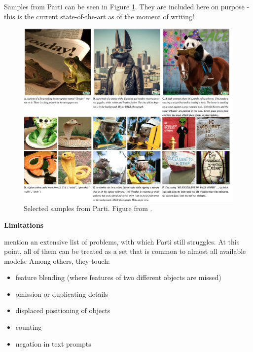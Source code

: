 \documentclass[
]{krantz}
\providecommand{\tightlist}{%
  \setlength{\itemsep}{0pt}\setlength{\parskip}{0pt}}
\begin{document}
Samples from Parti can be seen in Figure \ref{fig:partiimages}. They are included here on purpose - this is the current state-of-the-art as of the moment of writing!

\begin{figure}

{\centering \includegraphics[width=1\linewidth]{figures/02-02-text-2-img/partiimages} 

}

\caption{Selected samples from Parti. Figure from \citet{Parti2022}.}\label{fig:partiimages}
\end{figure}



\textbf{Limitations}

\citet{Parti2022} mention an extensive list of problems, with which Parti still struggles. At this point, all of them can be treated as a set that is common to almost all available models. Among others, they touch:

\begin{itemize}
\tightlist
\item
  feature blending (where features of two different objects are missed)
\item
  omission or duplicating details
\item
  displaced positioning of objects
\item
  counting
\item
  negation in text prompts
\end{itemize}
\end{document}
